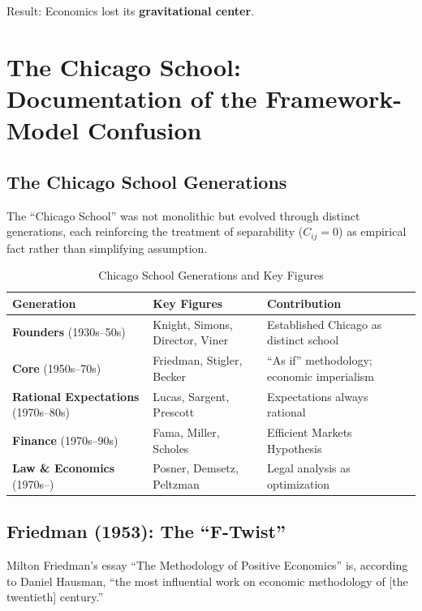 \documentclass[12pt,a4paper]{article}
\begin{document}
Result: Economics lost its \textbf{gravitational center}.

\section{The Chicago School: Documentation of the Framework-Model Confusion}
\label{sec:chicago}

\subsection{The Chicago School Generations}

The ``Chicago School'' was not monolithic but evolved through distinct generations, each reinforcing the treatment of separability ($C_{ij} = 0$) as empirical fact rather than simplifying assumption.

\begin{table}[H]
\centering
\caption{Chicago School Generations and Key Figures}
\label{tab:chicago-generations}
\renewcommand{\arraystretch}{1.3}
\small
\begin{tabular}{@{}llp{6cm}@{}}
\toprule
\textbf{Generation} & \textbf{Key Figures} & \textbf{Contribution} \\
\midrule
\textbf{Founders} (1930s--50s) & Knight, Simons, Director, Viner & Established Chicago as distinct school \\
\textbf{Core} (1950s--70s) & Friedman, Stigler, Becker & ``As if'' methodology; economic imperialism \\
\textbf{Rational Expectations} (1970s--80s) & Lucas, Sargent, Prescott & Expectations always rational \\
\textbf{Finance} (1970s--90s) & Fama, Miller, Scholes & Efficient Markets Hypothesis \\
\textbf{Law \& Economics} (1970s--) & Posner, Demsetz, Peltzman & Legal analysis as optimization \\
\bottomrule
\end{tabular}
\end{table}

\subsection{Friedman (1953): The ``F-Twist''}

Milton Friedman's essay ``The Methodology of Positive Economics'' is, according to Daniel Hausman, ``the most influential work on economic methodology of [the twentieth] century.''
\end{document}
